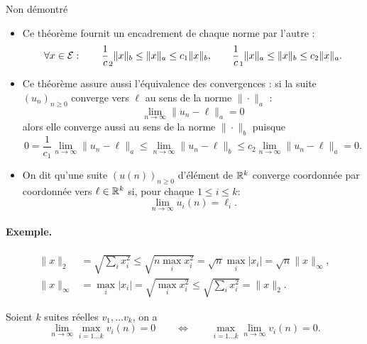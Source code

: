 \proof Non démontré \eproof

\remark
\begin{itemize}
  \item Ce théorème fournit un encadrement de chaque norme par l'autre : 
  $$
  \forall x \in \mathcal{E}: \qquad
  \frac1c_2 \|x\|_b \leq \|x\|_a \leq c_1 \|x\|_b, \qquad
  \frac1c_1 \|x\|_a \leq \|x\|_b \leq c_2 \|x\|_a.
  $$
  \item Ce théorème assure aussi l'équivalence des convergences : si la suite $(u_n)_{n \geq 0}$ converge vers $\ell$ au sens de la norme $\|\cdot\|_a$ :
  $$
  \lim_{n \rightarrow \infty} \|u_n - \ell\|_a = 0
  $$
  alors elle converge aussi au sens de la norme $\|\cdot\|_b$ puisque
  $$
  0 = \frac1{c_1} \lim_{n \rightarrow \infty} \|u_n - \ell\|_a
  \leq \lim_{n \rightarrow \infty} \|u_n - \ell\|_b \leq
  c_2 \lim_{n \rightarrow \infty} \|u_n - \ell\|_a = 0.
  $$
  \item On dit qu'une suite $(u(n))_{n \geq 0}$ d'élément de $\mathbb{R}^k$ converge coordonnée par coordonnée vers $\ell \in \mathbb{R}^k$ si, pour chaque $1 \leq i \leq k$:
  $$
  \lim_{n \rightarrow \infty} u_i(n) = \ell_i.
  $$
\end{itemize}

\paragraph*{Exemple.}
\begin{align*}
  \|x\|_2 & = \sqrt{\sum_i x_i^2}  \leq \sqrt{n \max_i x_i^2} = \sqrt{n} \max_i |x_i| = \sqrt{n} \|x\|_\infty, \\
  \|x\|_\infty & = \max_i |x_i| = \sqrt{\max_i x_i^2} \leq \sqrt{\sum_i x_i^2} = \|x\|_2.
\end{align*}

\begin{lemma*}
  Soient $k$ suites réelles $v_1, \dots v_k$, on a
  $$
  \lim_{n \rightarrow \infty} \max_{i=1 \dots k} v_i(n) = 0
  \qquad \Leftrightarrow \qquad
  \max_{i=1 \dots k} \lim_{n \rightarrow \infty} v_i(n) = 0.
  $$
\end{lemma*}

